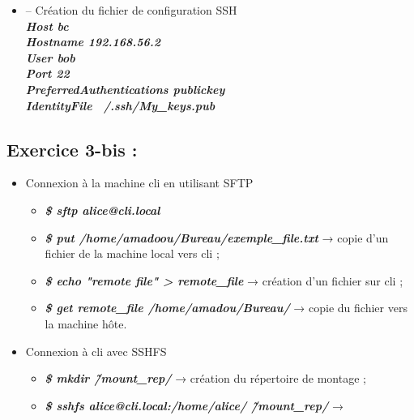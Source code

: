 \documentclass[a4paper]{article}
\begin{document}
	\begin{itemize}
		\item –	Création du fichier de configuration SSH \\
		\textbf{\textit{Host bc \\          
  					Hostname 192.168.56.2 \\
  					User bob \\
  					Port 22 \\
  					PreferredAuthentications publickey \\
  					IdentityFile ~/.ssh/My\_keys.pub \\ }}
 		
	\end{itemize}
	
	\subsection{Exercice 3-bis :}
	\begin{itemize}
		\item Connexion à la machine cli en utilisant SFTP
			\begin{itemize}
				\item \textbf{\textit{\$ sftp alice@cli.local}}
				\item \textbf{\textit{\$ put /home/amadoou/Bureau/exemple\_file.txt}} → copie d'un fichier de la machine local vers cli ;
				\item \textbf{\textit{\$ echo "remote file" > remote\_file}} → création d'un fichier sur cli ;
				\item \textbf{\textit{\$ get remote\_file /home/amadou/Bureau/}} → copie du fichier vers la machine hôte.
			\end{itemize}
		\item Connexion à cli avec SSHFS
			\begin{itemize}
				\item \textbf{\textit{\$ mkdir \~/mount\_rep/}} → création du répertoire de montage ;
				\item \textbf{\textit{\$ sshfs alice@cli.local:/home/alice/ \~/mount\_rep/}} → 
			\end{itemize}
	\end{itemize}
\end{document}
